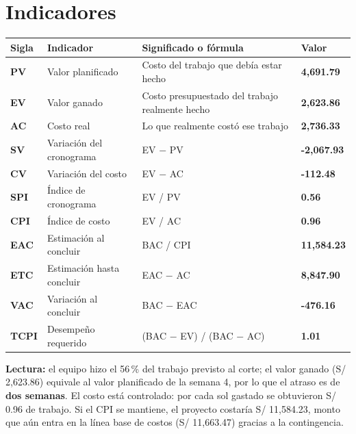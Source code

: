 \documentclass[11pt,a4paper]{article}
\begin{document}
\section{Indicadores}
{\small
{}
\noindent\begin{tabularx}{\textwidth}{@{}C{1.1cm} P{3.6cm} L Q{2.0cm}@{}}
\toprule
{}
\textbf{Sigla} & \textbf{Indicador} & \textbf{Significado o fórmula} & \textbf{Valor} \\
\midrule
\textbf{PV} & Valor planificado & Costo del trabajo que debía estar hecho & \textbf{4,691.79} \\
\textbf{EV} & Valor ganado & Costo presupuestado del trabajo realmente hecho & \textbf{2,623.86} \\
\textbf{AC} & Costo real & Lo que realmente costó ese trabajo & \textbf{2,736.33} \\
\textbf{SV} & Variación del cronograma & EV $-$ PV & \textbf{\textcolor{SevAlta}{-2,067.93}} \\
\textbf{CV} & Variación del costo & EV $-$ AC & \textbf{\textcolor{SevMedia}{-112.48}} \\
\textbf{SPI} & Índice de cronograma & EV / PV & \textbf{\textcolor{SevAlta}{0.56}} \\
\textbf{CPI} & Índice de costo & EV / AC & \textbf{\textcolor{SevMedia}{0.96}} \\
\textbf{EAC} & Estimación al concluir & BAC / CPI & \textbf{\textcolor{SevMedia}{11,584.23}} \\
\textbf{ETC} & Estimación hasta concluir & EAC $-$ AC & \textbf{8,847.90} \\
\textbf{VAC} & Variación al concluir & BAC $-$ EAC & \textbf{\textcolor{SevMedia}{-476.16}} \\
\textbf{TCPI} & Desempeño requerido & (BAC $-$ EV) / (BAC $-$ AC) & \textbf{1.01} \\
\bottomrule
\end{tabularx}
}

\vspace{0.15cm}
\noindent\textbf{Lectura:} el equipo hizo el 56\,\% del trabajo previsto al corte; el valor ganado (S/ 2,623.86) equivale al valor planificado de la semana 4, por lo que el atraso es de \textbf{dos semanas}. El costo está controlado: por cada sol gastado se obtuvieron S/ 0.96 de trabajo. Si el CPI se mantiene, el proyecto costaría S/ 11,584.23, monto que aún entra en la línea base de costos (S/ 11,663.47) gracias a la contingencia.
\end{document}
